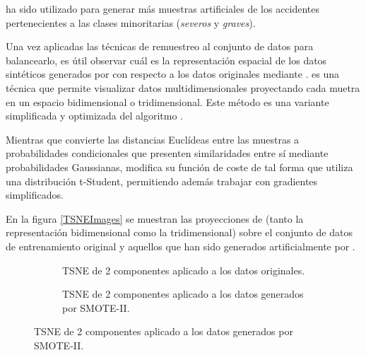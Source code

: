 \begin{enumerate}
\begin{enumerate}
\begin{enumerate}
                         ha sido utilizado para generar más muestras artificiales de los accidentes pertenecientes a las clases minoritarias (\textit{severos} y \textit{graves}).

                    \end{enumerate}


                    Una vez aplicadas las técnicas de remuestreo al conjunto de datos para balancearlo, es útil observar cuál es la representación espacial de los datos sintéticos generados por  con respecto a los datos originales mediante  \cite{TSNEPaper}.  es una técnica que permite visualizar datos multidimensionales proyectando cada muetra en un espacio bidimensional o tridimensional. Este método es una variante simplificada y optimizada del algoritmo .

                    Mientras que  convierte las distancias Euclídeas entre las muestras a probabilidades condicionales que presenten similaridades entre sí mediante probabilidades Gaussianas,  modifica su función de coste de tal forma que utiliza una distribución t-Student, permitiendo además trabajar con gradientes simplificados.


                    En la figura \ref{TSNEImages} se muestran las proyecciones de  (tanto la representación bidimensional como la tridimensional) sobre el conjunto de datos de entrenamiento original y aquellos que han sido generados artificialmente por .


                    \begin{figure}
                        \centering
                        \begin{subfigure}[b]{0.4\textwidth}
                            \centering
                            
                            \caption{TSNE de 2 componentes aplicado a los datos originales.}
                            \label{TSNEImages:Clean2D}
                        \end{subfigure}
                        \begin{subfigure}[b]{0.4\textwidth}
                            \centering
                            
                            \caption{TSNE de 2 componentes aplicado a los datos generados por SMOTE-II.}
                            \label{TSNEImages:Train2D}


\end{subfigure}
\end{figure}
\end{enumerate}
\end{enumerate}
